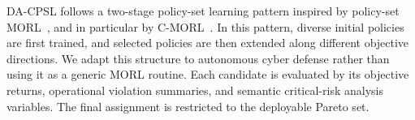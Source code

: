 \documentclass[sigconf,review,anonymous]{acmart}
\begin{document}

DA-CPSL follows a two-stage policy-set learning pattern inspired by
policy-set MORL~\cite{vanmoffaert2014sets,hayes2022practical}, and in
particular by C-MORL~\cite{liu2025cmorl}. In this pattern, diverse
initial policies are first trained, and selected policies are then
extended along different objective directions. We adapt this structure to
autonomous cyber defense rather than using it as a generic MORL routine.
Each candidate is evaluated by its objective returns, operational
violation summaries, and semantic critical-risk analysis variables. The
final assignment is restricted to the deployable Pareto set.
\end{document}
